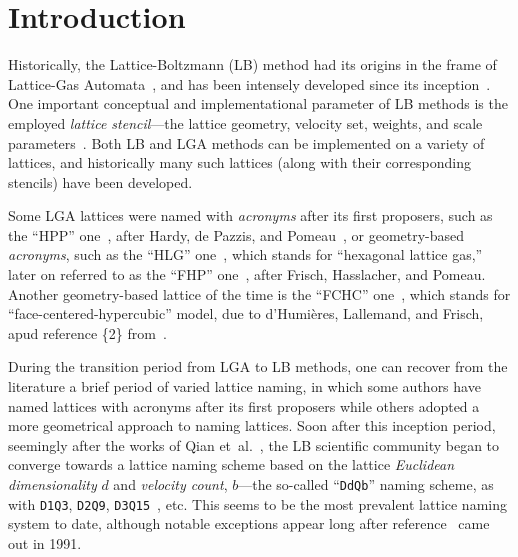 \section{Introduction}

    Historically,   the   Lattice-Boltzmann   (LB)    method    had    its    origins    in    the    frame    of    Lattice-Gas
    Automata~\cite{1988-McNamaraGR+ZanettiG-PhysRevLett},     and     has     been     intensely     developed     since     its
    inception~\cite{2018-KrugerT+ViggenEM-Springer}. One important conceptual and implementational parameter of  LB  methods  is
    the    employed    \emph{lattice    stencil}---the    lattice    geometry,    velocity    set,    weights,     and     scale
    parameters~\cite{2013-HegeleJr+PhilippiPC-JSciComput,                                2013-MattilaKK+PhilippiPC-IntJModPhysC,
    2014-MattilaKK+PhilippiPC-SciWorldJ}. Both LB and LGA methods can be implemented on a variety of lattices, and  historically
    many such lattices (along with their corresponding stencils) have been developed.

    Some   LGA   lattices   were   named   with   \emph{acronyms}   after   its   first   proposers,   such   as   the   ``HPP''
    one~\cite{1986-FrischU+PomeauY-PhysRevLett},  after  Hardy,  de  Pazzis,   and   Pomeau~\cite{1973-HardyJ+PazzisO-JMathPhys,
    1976-HardyJ+PomeauY-PhysRevA},      or      geometry-based      \emph{acronyms},       such       as       the       ``HLG''
    one~\cite{1986-FrischU+PomeauY-PhysRevLett}, which stands for ``hexagonal lattice gas,'' later on referred to as the ``FHP''
    one~\cite{1987-FrischU+RivetJP-ComplexSyst}, after Frisch, Hasslacher, and Pomeau. Another  geometry-based  lattice  of  the
    time is the ``FCHC'' one~\cite{1987-FrischU+RivetJP-ComplexSyst}, which stands for ``face-centered-hypercubic''  model,  due
    to d'Humières, Lallemand, and Frisch, apud reference \{2\} from~\cite{1987-FrischU+RivetJP-ComplexSyst}.
    

    During the transition period from LGA to LB methods, one can recover from the literature a brief period  of  varied  lattice
    naming, in which some authors have named lattices with acronyms after its  first  proposers  while  others  adopted  a  more
    geometrical  approach  to  naming  lattices.  Soon  after  this  inception  period,  seemingly  after  the  works  of   Qian
    et~al.~\cite{1991-QianYH+LallemandP-AdvKinTheoContMech, 1992-QianYH+LallemandP-EurophysLett}, the  LB  scientific  community
    began to  converge  towards  a  lattice  naming  scheme  based  on  the  lattice  \emph{Euclidean  dimensionality}  $d$  and
    \emph{velocity  count},  $b$---the  so-called  ``\texttt{DdQb}''  naming  scheme,  as  with  \texttt{D1Q3},   \texttt{D2Q9},
    \texttt{D3Q15}~\cite{1992-QianYH+LallemandP-EurophysLett}, etc. This seems to be the most prevalent lattice naming system to
    date, although notable exceptions appear long after reference~\cite{1991-QianYH+LallemandP-AdvKinTheoContMech} came  out  in
    1991.

